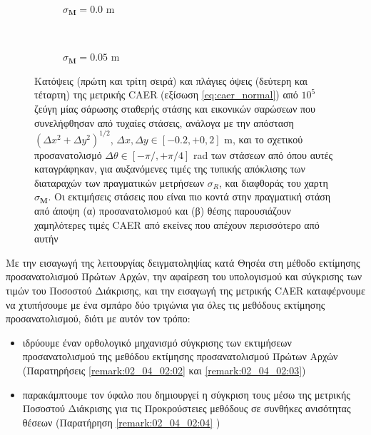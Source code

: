 \begin{figure}[!h]
  \begin{subfigure}{\linewidth}\hspace{1cm}
    
    \vspace{0.25cm}
    \caption{\small $\sigma_{\bm{M}} = 0.0$ m}
    \vspace{0.5cm}
  \end{subfigure}\\%
  \begin{subfigure}{\linewidth}\hspace{1cm}
    
    \vspace{0.25cm}
    \caption{\small $\sigma_{\bm{M}} = 0.05$ m}
    \vspace{0.5cm}
  \end{subfigure}%
  \vspace{-0.25cm}
  \caption{\small Κατόψεις (πρώτη και τρίτη σειρά) και πλάγιες όψεις
           (δεύτερη και τέταρτη) της μετρικής CAER (εξίσωση
           \ref{eq:caer_normal}) από $10^5$ ζεύγη μίας σάρωσης σταθερής στάσης
           και εικονικών σαρώσεων που συνελήφθησαν από τυχαίες στάσεις, ανάλογα
           με την απόσταση $(\Delta x^2 + \Delta y^2)^{1/2}$, $\Delta x, \Delta
           y \in [-0.2, +0,2]$ m, και το σχετικού προσανατολισμό $\Delta \theta
           \in [-\pi/, +\pi/4]$ rad των στάσεων από όπου αυτές καταγράφηκαν,
           για αυξανόμενες τιμές της τυπικής απόκλισης των διαταραχών των
           πραγματικών μετρήσεων $\sigma_R$, και διαφθοράς του χαρτη
           $\sigma_{\bm{M}}$. Οι εκτιμήσεις στάσεις που είναι πιο κοντά στην
           πραγματική στάση από άποψη (α) προσανατολισμού και (β) θέσης
           παρουσιάζουν χαμηλότερες τιμές CAER από εκείνες που απέχουν
           περισσότερο από αυτήν}
  \label{fig:02_04_04:caer}
\end{figure}

Με την εισαγωγή της λειτουργίας δειγματοληψίας κατά Θησέα στη μέθοδο εκτίμησης
προσανατολισμού Πρώτων Αρχών, την αφαίρεση του υπολογισμού και σύγκρισης των
τιμών του Ποσοστού Διάκρισης, και την εισαγωγή της μετρικής CAER καταφέρνουμε
να χτυπήσουμε με ένα σμπάρο δύο τριγώνια για όλες τις μεθόδους εκτίμησης
προσανατολισμού, διότι με αυτόν τον τρόπο:

\begin{itemize}
  \item ιδρύουμε έναν ορθολογικό μηχανισμό σύγκρισης των
        εκτιμήσεων προσανατολισμού της μεθόδου εκτίμησης προσανατολισμού Πρώτων
        Αρχών (Παρατηρήσεις \ref{remark:02_04_02:02} και
        \ref{remark:02_04_02:03})
  \item παρακάμπτουμε τον ύφαλο που δημιουργεί η σύγκριση τους μέσω της μετρικής
        Ποσοστού Διάκρισης για τις Προκρούστειες μεθόδους σε συνθήκες ανισότητας
        θέσεων (Παρατήρηση \ref{remark:02_04_02:04} )
\end{itemize}

